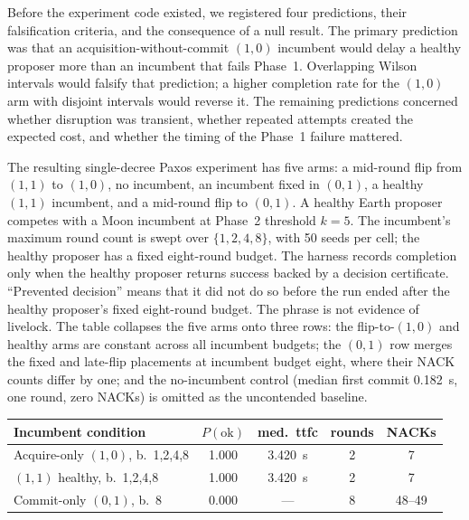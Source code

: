 \documentclass[letterpaper,twocolumn,10pt]{article}
\newcounter{prop}
\newcounter{cor}
\begin{document}
Before the experiment code existed, we registered four predictions, their falsification criteria, and the consequence of a null result. The primary prediction was that an acquisition-without-commit $(1,0)$ incumbent would delay a healthy proposer more than an incumbent that fails Phase~1. Overlapping Wilson intervals would falsify that prediction; a higher completion rate for the $(1,0)$ arm with disjoint intervals would reverse it. The remaining predictions concerned whether disruption was transient, whether repeated attempts created the expected cost, and whether the timing of the Phase~1 failure mattered.

The resulting single-decree Paxos experiment has five arms: a mid-round flip from $(1,1)$ to $(1,0)$, no incumbent, an incumbent fixed in $(0,1)$, a healthy $(1,1)$ incumbent, and a mid-round flip to $(0,1)$. A healthy Earth proposer competes with a Moon incumbent at Phase~2 threshold $k=5$. The incumbent's maximum round count is swept over $\{1,2,4,8\}$, with 50 seeds per cell; the healthy proposer has a fixed eight-round budget. The harness records completion only when the healthy proposer returns success backed by a decision certificate. ``Prevented decision'' means that it did not do so before the run ended after the healthy proposer's fixed eight-round budget. The phrase is not evidence of livelock. The table collapses the five arms onto three rows: the flip-to-$(1,0)$ and healthy arms are constant across all incumbent budgets; the $(0,1)$ row merges the fixed and late-flip placements at incumbent budget eight, where their NACK counts differ by one; and the no-incumbent control (median first commit 0.182~s, one round, zero NACKs) is omitted as the uncontended baseline.

\begin{center}
\setlength{\tabcolsep}{4pt}
\footnotesize
\begin{tabular}{@{}lcccc@{}}
\toprule
Incumbent condition & $P(\text{ok})$ & med.\ ttfc & rounds & NACKs \\
\midrule
Acquire-only $(1,0)$, b.~1,2,4,8 & 1.000 & 3.420~s & 2 & 7 \\
$(1,1)$ healthy, b.~1,2,4,8 & 1.000 & 3.420~s & 2 & 7 \\
Commit-only $(0,1)$, b.~8 & 0.000 & --- & 8 & 48--49 \\
\bottomrule
\end{tabular}
\end{center}
\end{document}

